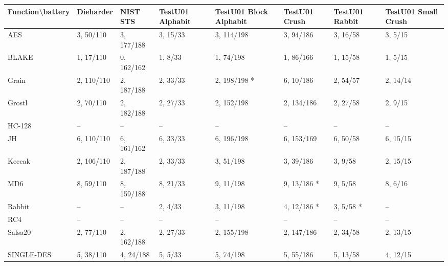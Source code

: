\documentclass[
  print, %
  Table,   %
  nolof,     %
  nolot,     %
  11pt, %
  oneside  %
]{fithesis3}
\begin{document}
\begin{table}[H]
\centering{}
\hspace*{-3cm}
\begin{tabular}{l|p{1.8cm} p{1.8cm} p{1.8cm} p{1.8cm} p{1.8cm} p{1.8cm} p{1.8cm}}
Function\textbackslash{}battery &
              Dieharder & NIST STS  & TestU01 Alphabit  & TestU01 Block Alphabit    & TestU01 Crush & TestU01 Rabbit    & TestU01 Small Crush   \\ \hline
AES         & 3, 50/110 & 3, 177/188& 3, 15/33          & 3, 114/198                & 3, 94/186     & 3, 16/58          & 3, 5/15               \\
BLAKE       & 1, 17/110 & 0, 162/162& 1, 8/33           & 1, 74/198                 & 1, 86/166     & 1, 15/58          & 1, 5/15               \\
Grain       & 2, 110/110& 2, 187/188& 2, 33/33          & 2, 198/198 *              & 6, 10/186     & 2, 54/57          & 2, 14/14              \\
Grostl      & 2, 70/110 & 2, 182/188& 2, 27/33          & 2, 152/198                & 2, 134/186    & 2, 27/58          & 2, 9/15               \\
HC-128      & --        & --        & --                & --                        & --            & --                & --                    \\
JH          & 6, 110/110& 6, 161/162& 6, 33/33          & 6, 196/198                & 6, 153/169    & 6, 50/58          & 6, 15/15              \\
Keccak      & 2, 106/110& 2, 187/188& 2, 33/33          & 3, 51/198                 & 3, 39/186     & 3, 9/58           & 2, 15/15              \\
MD6         & 8, 59/110 & 8, 159/188& 8, 21/33          & 9, 11/198                 & 9, 13/186 *   & 9, 5/58           & 8, 6/16               \\
Rabbit      & --        & --        & 2, 4/33           & 3, 11/198                 & 4, 12/186 *   & 3, 5/58 *         & --                    \\
RC4         & --        & --        & --                & --                        & --            & --                & --                    \\
Salsa20     & 2, 77/110 & 2, 162/188& 2, 27/33          & 2, 155/198                & 2, 147/186    & 2, 34/58          & 2, 13/15              \\
SINGLE-DES  & 5, 38/110 & 4, 24/188 & 5, 5/33           & 5, 74/198                 & 5, 55/186     & 5, 13/58          & 4, 12/15              \\

\end{tabular}
\end{table}
\end{document}
